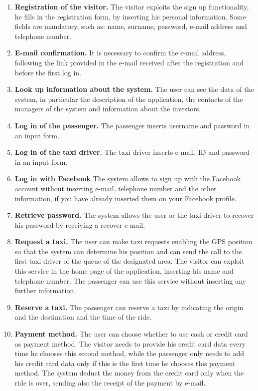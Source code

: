 \documentclass[18pt,oneside,a4paper, titlepage]{article}
\begin{document}
		\begin{enumerate}
			\item \textbf{Registration of the visitor.}
				The visitor exploits the sign up functionality, he fills in the registration form, by inserting his personal information. Some fields are mandatory, such as: name, surname, password, e-mail address and telephone number.
			\item \textbf{E-mail confirmation.}
				It is necessary to confirm the e-mail address, following the link provided in the e-mail received after the registration and before the first log in.
			\item \textbf{Look up information about the system.}
				The user can see the data of the system, in particular the description of the application, the contacts of the managers of the system and information about the investors.
			\item \textbf{Log in of the passenger.}
				The passenger inserts username and password in an input form.
			\item \textbf{Log in of the taxi driver.}
				The taxi driver inserts e-mail, ID and password in an input form.
			\item \textbf{Log in with Facebook}
				The system allows to sign up with the Facebook account without inserting e-mail, telephone number and the other information, if you have already inserted them on your Facebook profile. 
			\item \textbf{Retrieve password.}
				The system allows the user or the taxi driver to recover his password by receiving a recover e-mail.
			\item \textbf{Request a taxi.}
				The user can make taxi requests enabling the GPS position so that the system can determine his position and can send the call to the first taxi driver of the queue of the designated area. 
				The visitor can exploit this service in the home page of the application, inserting his name and telephone number.
				The passenger can use this service without inserting any further information.
			\item \textbf{Reserve a taxi.}
				The passenger can reserve a taxi by indicating the origin and the destination and the time of the ride.
			\item \textbf{Payment method.}
				The user can choose whether to use cash or credit card as payment method. The visitor needs to provide his credit card data every time he chooses this second method, while the passenger only needs to add his credit card data only if this is the first time he chooses this payment method. The system deduct the money from the credit card only when the ride is over, sending also the receipt of the payment by e-mail.

\end{enumerate}
\end{document}
